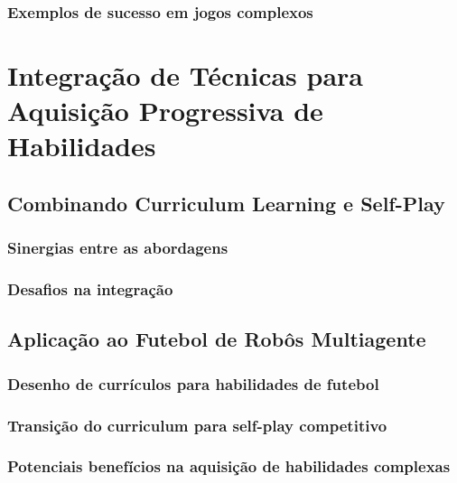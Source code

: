 \subsubsection{Exemplos de sucesso em jogos complexos}
\label{subsubsec:self_play_exemplos}

\section{Integração de Técnicas para Aquisição Progressiva de Habilidades}
\label{sec:integracao}

\subsection{Combinando Curriculum Learning e Self-Play}
\label{subsec:combinacao}

\subsubsection{Sinergias entre as abordagens}
\label{subsubsec:sinergias}

\subsubsection{Desafios na integração}
\label{subsubsec:desafios_integracao}

\subsection{Aplicação ao Futebol de Robôs Multiagente}
\label{subsec:aplicacao_futebol}

\subsubsection{Desenho de currículos para habilidades de futebol}
\label{subsubsec:curriculos_futebol}

\subsubsection{Transição do curriculum para self-play competitivo}
\label{subsubsec:transicao_self_play}

\subsubsection{Potenciais benefícios na aquisição de habilidades complexas}
\label{subsubsec:beneficios_aquisicao}